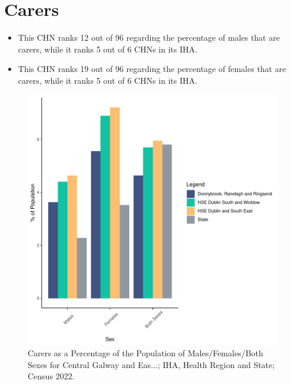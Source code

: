 \documentclass{article}
\begin{document}
\section{Carers}\label{sect:Carers}
\begin{itemize}
\item This CHN ranks  12 out of 96 regarding the percentage of males that are carers, while it ranks   5 out of 6 CHNs in its IHA.
\item This CHN ranks  19 out of 96 regarding the percentage of females that are carers, while it ranks   5 out of 6 CHNs in its IHA.
\end{itemize}
\begin{figure}[H]
	\centering
	\includegraphics[width = 150mm]{../figures/CareED.pdf}
	\caption{Carers as a Percentage of the Population of Males/Females/Both Sexes for Central Galway and Eas...; IHA, Health Region and State; Census 2022.}
	\label{fig:2ae19629-1a6a-13a3-e055-000000000001}
	\end{figure}
\end{document}

